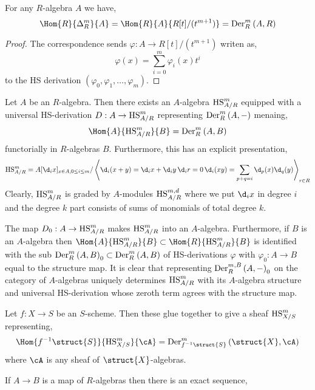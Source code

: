 \documentclass[12pt]{article}
\begin{document}
\begin{prop}
For any $R$-algebra $A$ we have,
\[ \Hom{R}{\Delta^m_R}{A} = \Hom{R}{A}{R[t]/(t^{m+1})} = \HSDer{R}{m}{A}{R} \]
\end{prop}

\begin{proof}
The correspondence sends $\varphi : A \to R[t]/(t^{m+1})$ writen as,
\[ \varphi(x) = \sum_{i = 0}^m \varphi_i(x) t^i \]
to the HS derivation $(\varphi_0, \varphi_1, \dots, \varphi_m)$.
\end{proof}

\begin{prop}
Let $A$ be an $R$-algebra. Then there exists an $A$-algebra $\HS_{A/R}^m$ equipped with a universal HS-derivation $D : A \to \HS_{A/R}^m$ representing $\HSDer{R}{m}{A}{-}$ menaing,
\[ \Hom{A}{\HS_{A/R}^m}{B} = \HSDer{R}{m}{A}{B} \]
functorially in $R$-algebras $B$. Furthermore, this has an explicit presentation,
\[ \HS_{A/R}^m = A [ \d_i{x} ]_{x \in A, 0 \le i \le m} / \left< \d_i(x+y) = \d_i{x} + \d_i{y} \, \d_i{r} = 0 \, \d_i(xy) = \sum_{p + q = i} \d_p(x) \d_q(y) \right>_{r \in R} \]
Clearly, $\HS_{A/R}^m$ is graded by $A$-modules $\HS_{A/R}^{m,d}$ where we put $\d_i{x}$ in degree $i$ and the degree $k$ part consists of sums of monomials of total degree $k$.
\end{prop}

\begin{rmk}
The map $D_0 : A \to \HS^m_{A/R}$ makes $\HS^m_{A/R}$ into an $A$-algebra. Furthermore, if $B$ is an $A$-algebra then $\Hom{A}{\HS^m_{A/R}}{B} \subset \Hom{R}{\HS^m_{A/R}}{B}$ is identified with the sub $\HSDer{R}{m}{A}{B}_0 \subset \HSDer{R}{m}{A}{B}$ of HS-derivations $\varphi$ with $\varphi_0 : A \to B$ equal to the structure map. It is clear that representing $\HSDer{R}{m,B}{A}{-}_0$ on the category of $A$-algebras uniquely determines $\HS^m_{A/R}$ with its $A$-algebra structure and universal HS-derivation whose zeroth term agrees with the structure map.   
\end{rmk}

\begin{prop}
Let $f : X \to S$ be an $S$-scheme. Then these glue together to give a sheaf $\HS_{X/S}^m$ representing,
\[ \Hom{f^{-1} \struct{S}}{\HS_{X/S}^m}{\cA} = \HSDer{f^{-1} \struct{S}}{m}{\struct{X}}{\cA} \]
where $\cA$ is any sheaf of $\struct{X}$-algebras.
\end{prop}

\begin{lemma}
If $A \to B$ is a map of $R$-algebras then there is an exact sequence,
\begin{center}
\end{center}
\end{lemma}
\end{document}
